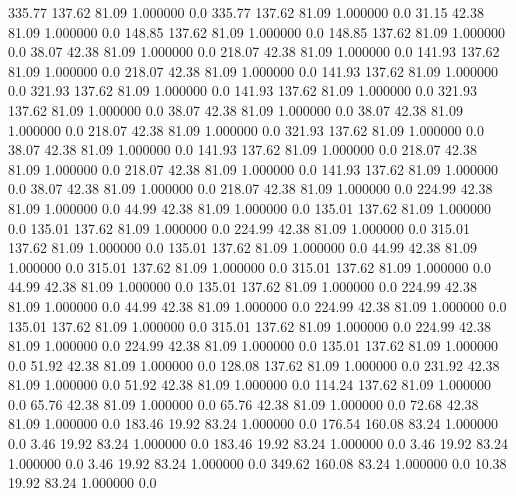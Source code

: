   335.77  137.62   81.09    1.000000    0.0
  335.77  137.62   81.09    1.000000    0.0
   31.15   42.38   81.09    1.000000    0.0
  148.85  137.62   81.09    1.000000    0.0
  148.85  137.62   81.09    1.000000    0.0
   38.07   42.38   81.09    1.000000    0.0
  218.07   42.38   81.09    1.000000    0.0
  141.93  137.62   81.09    1.000000    0.0
  218.07   42.38   81.09    1.000000    0.0
  141.93  137.62   81.09    1.000000    0.0
  321.93  137.62   81.09    1.000000    0.0
  141.93  137.62   81.09    1.000000    0.0
  321.93  137.62   81.09    1.000000    0.0
   38.07   42.38   81.09    1.000000    0.0
   38.07   42.38   81.09    1.000000    0.0
  218.07   42.38   81.09    1.000000    0.0
  321.93  137.62   81.09    1.000000    0.0
   38.07   42.38   81.09    1.000000    0.0
  141.93  137.62   81.09    1.000000    0.0
  218.07   42.38   81.09    1.000000    0.0
  218.07   42.38   81.09    1.000000    0.0
  141.93  137.62   81.09    1.000000    0.0
   38.07   42.38   81.09    1.000000    0.0
  218.07   42.38   81.09    1.000000    0.0
  224.99   42.38   81.09    1.000000    0.0
   44.99   42.38   81.09    1.000000    0.0
  135.01  137.62   81.09    1.000000    0.0
  135.01  137.62   81.09    1.000000    0.0
  224.99   42.38   81.09    1.000000    0.0
  315.01  137.62   81.09    1.000000    0.0
  135.01  137.62   81.09    1.000000    0.0
   44.99   42.38   81.09    1.000000    0.0
  315.01  137.62   81.09    1.000000    0.0
  315.01  137.62   81.09    1.000000    0.0
   44.99   42.38   81.09    1.000000    0.0
  135.01  137.62   81.09    1.000000    0.0
  224.99   42.38   81.09    1.000000    0.0
   44.99   42.38   81.09    1.000000    0.0
  224.99   42.38   81.09    1.000000    0.0
  135.01  137.62   81.09    1.000000    0.0
  315.01  137.62   81.09    1.000000    0.0
  224.99   42.38   81.09    1.000000    0.0
  224.99   42.38   81.09    1.000000    0.0
  135.01  137.62   81.09    1.000000    0.0
   51.92   42.38   81.09    1.000000    0.0
  128.08  137.62   81.09    1.000000    0.0
  231.92   42.38   81.09    1.000000    0.0
   51.92   42.38   81.09    1.000000    0.0
  114.24  137.62   81.09    1.000000    0.0
   65.76   42.38   81.09    1.000000    0.0
   65.76   42.38   81.09    1.000000    0.0
   72.68   42.38   81.09    1.000000    0.0
  183.46   19.92   83.24    1.000000    0.0
  176.54  160.08   83.24    1.000000    0.0
    3.46   19.92   83.24    1.000000    0.0
  183.46   19.92   83.24    1.000000    0.0
    3.46   19.92   83.24    1.000000    0.0
    3.46   19.92   83.24    1.000000    0.0
  349.62  160.08   83.24    1.000000    0.0
   10.38   19.92   83.24    1.000000    0.0
